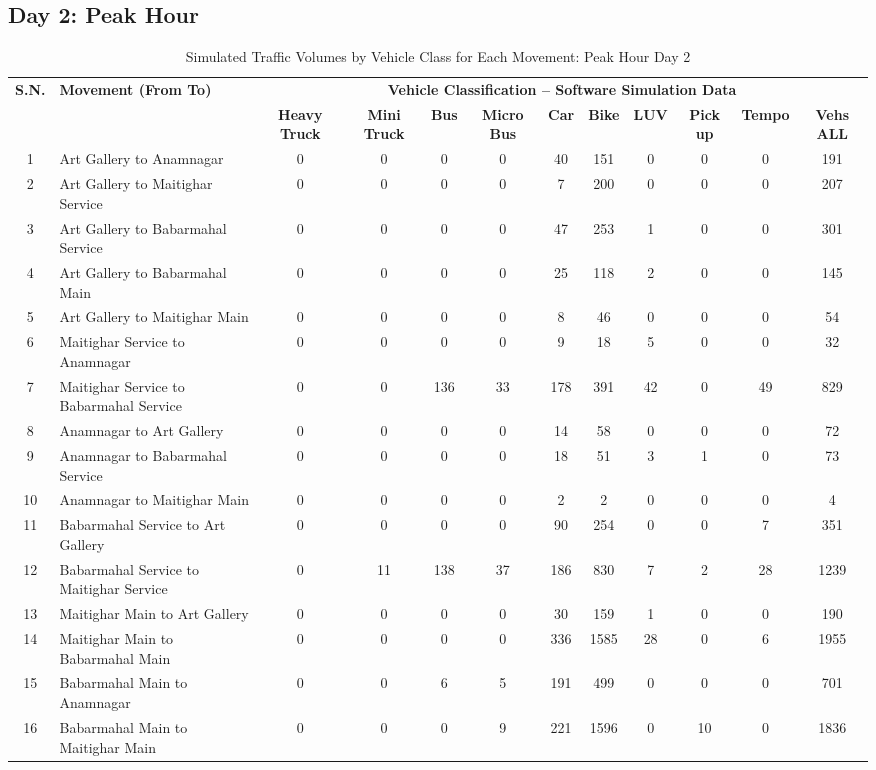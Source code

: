 \begin{landscape}
\section{Day 2: Peak Hour}
\begin{table}[h!]
\centering
\caption{Simulated Traffic Volumes by Vehicle Class for Each Movement: Peak Hour Day 2}
\small
\setlength{\tabcolsep}{6pt}
\begin{tabular}{|c|p{6cm}|c|c|c|c|c|c|c|c|c|c|}
\hline
\textbf{S.N.} & \textbf{Movement (From To)} &\multicolumn{10}{|c|}{\textbf{Vehicle Classification -- Software Simulation Data}} \\
\cline{3-12}
& & \textbf{Heavy Truck} & \textbf{Mini Truck} & \textbf{Bus} & \textbf{Micro Bus} & \textbf{Car} & \textbf{Bike} & \textbf{LUV} & \textbf{Pick up} & \textbf{Tempo} & \textbf{Vehs ALL} \\
\hline
    1 & Art Gallery to Anamnagar & 0 & 0 & 0 & 0 & 40 & 151 & 0 & 0 & 0 & 191 \\
    \hline
    2 & Art Gallery to Maitighar Service & 0 & 0 & 0 & 0 & 7 & 200 & 0 & 0 & 0 & 207 \\
    \hline
    3 & Art Gallery to Babarmahal Service & 0 & 0 & 0 & 0 & 47 & 253 & 1 & 0 & 0 & 301 \\
    \hline
    4 & Art Gallery to Babarmahal Main & 0 & 0 & 0 & 0 & 25 & 118 & 2 & 0 & 0 & 145 \\
    \hline
    5 & Art Gallery to Maitighar Main & 0 & 0 & 0 & 0 & 8 & 46 & 0 & 0 & 0 & 54 \\
    \hline
    6 & Maitighar Service to Anamnagar & 0 & 0 & 0 & 0 & 9 & 18 & 5 & 0 & 0 & 32 \\
    \hline
    7 & Maitighar Service to Babarmahal Service & 0 & 0 & 136 & 33 & 178 & 391 & 42 & 0 & 49 & 829 \\
    \hline
    8 & Anamnagar to Art Gallery & 0 & 0 & 0 & 0 & 14 & 58 & 0 & 0 & 0 & 72 \\
    \hline
    9 & Anamnagar to Babarmahal Service & 0 & 0 & 0 & 0 & 18 & 51 & 3 & 1 & 0 & 73 \\
    \hline
    10 & Anamnagar to Maitighar Main & 0 & 0 & 0 & 0 & 2 & 2 & 0 & 0 & 0 & 4 \\
    \hline
    11 & Babarmahal Service to Art Gallery & 0 & 0 & 0 & 0 & 90 & 254 & 0 & 0 & 7 & 351 \\
    \hline
    12 & Babarmahal Service to Maitighar Service & 0 & 11 & 138 & 37 & 186 & 830 & 7 & 2 & 28 & 1239 \\
    \hline
    13 & Maitighar Main to Art Gallery & 0 & 0 & 0 & 0 & 30 & 159 & 1 & 0 & 0 & 190 \\
    \hline
    14 & Maitighar Main to Babarmahal Main & 0 & 0 & 0 & 0 & 336 & 1585 & 28 & 0 & 6 & 1955 \\
    \hline
    15 & Babarmahal Main to Anamnagar & 0 & 0 & 6 & 5 & 191 & 499 & 0 & 0 & 0 & 701 \\
    \hline
    16 & Babarmahal Main to Maitighar Main & 0 & 0 & 0 & 9 & 221 & 1596 & 0 & 10 & 0 & 1836 \\
    \hline   
    \end{tabular}
\end{table}
\end{landscape}

